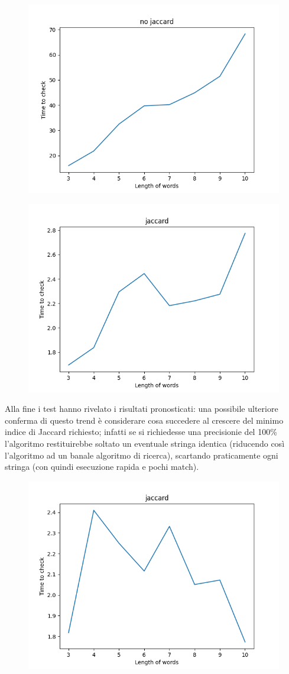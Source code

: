 \documentclass{article}
\begin{document}
\begin{figure}[h]
\centering
\includegraphics[width=0.7\linewidth]
{"./myplotnj.png"}
\label{no jaccard}
\end{figure}
\begin{figure}[h]
\centering
\includegraphics[width=0.7\linewidth]
{"./myplotj.png"}
\label{jaccard}
\end{figure}
Alla fine i test hanno rivelato i risultati pronosticati: una possibile ulteriore conferma di questo trend è considerare cosa succedere al crescere del minimo indice di Jaccard richiesto; infatti se si richiedesse una precisionie del 100\% l'algoritmo restituirebbe soltato un eventuale stringa identica (riducendo così l'algoritmo ad un banale algoritmo di ricerca), scartando praticamente ogni stringa (con quindi esecuzione rapida e pochi match).
\newpage
\begin{figure}[h]
\centering
\includegraphics[width=0.7\linewidth]
{"./myplotj66.png"}
\label{jaccard (threshold=0.66)}
\end{figure}
\end{document}

